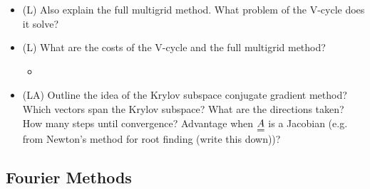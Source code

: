 \begin{itemize}
\begin{itemize}
    \end{itemize}
    \item (L) Also explain the full multigrid method. What problem
    of the V-cycle does it solve?
    \item (L) What are the costs of the V-cycle and the full multigrid method?
    \begin{itemize}
        \item {}
    \end{itemize}
    \item (LA) Outline the idea of the Krylov subspace conjugate gradient method? Which vectors span the Krylov subspace?
    What are the directions taken? How many steps until convergence? Advantage when $\mat{A}$ is a Jacobian (e.g. from 
    Newton's method for root finding (write this down))?
\end{itemize}

\subsection*{Fourier Methods}

